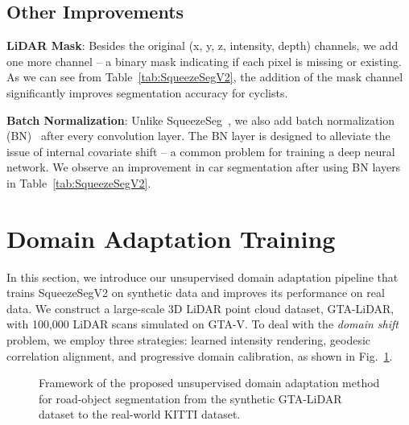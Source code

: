 \documentclass[letterpaper, 10 pt, conference]{ieeeconf}
\begin{document}
\subsection{Other Improvements}
\textbf{LiDAR Mask}: Besides the original (x, y, z, intensity, depth) channels, we add one more channel -- a binary mask indicating if each pixel is missing or existing. As we can see from Table~\ref{tab:SqueezeSegV2}, the addition of the mask channel significantly improves segmentation accuracy for cyclists.

\textbf{Batch Normalization}: Unlike SqueezeSeg~\cite{wu2017squeezeseg}, we also add batch normalization (BN)~\cite{ioffe2015batch} after every convolution layer. The BN layer is designed to alleviate the issue of internal covariate shift -- a common problem for training a deep neural network. We observe an improvement in car segmentation after using BN layers in Table~\ref{tab:SqueezeSegV2}.


\section{Domain Adaptation Training}
\label{sec:Stronger}
In this section, we introduce our unsupervised domain adaptation pipeline that trains SqueezeSegV2 on synthetic data and improves its performance on real data. We construct a large-scale 3D LiDAR point cloud dataset, GTA-LiDAR, with 100,000 LiDAR scans simulated on GTA-V. To deal with the \emph{domain shift} problem, we employ three strategies: learned intensity rendering, geodesic correlation alignment, and progressive domain calibration, as shown in Fig.~\ref{fig:DAFramework}.
\vspace{-0.1cm}

\begin{figure}[!t]
\begin{center}
\caption{Framework of the proposed unsupervised domain adaptation method for road-object segmentation from the synthetic GTA-LiDAR dataset to the real-world KITTI dataset.}

\vspace{-0.6cm}
\label{fig:DAFramework}
\end{center}
\end{figure}
\end{document}
